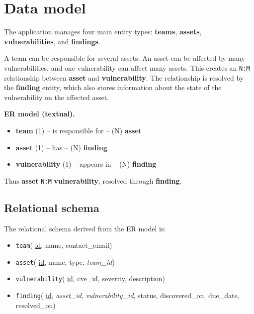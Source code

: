 \documentclass[11pt,a4paper]{article}
\begin{document}
\section{Data model}

The application manages four main entity types:
\textbf{teams}, \textbf{assets}, \textbf{vulnerabilities}, and
\textbf{findings}.

A team can be responsible for several assets. An asset can be affected by many
vulnerabilities, and one vulnerability can affect many assets. This creates an
\texttt{N:M} relationship between \textbf{asset} and
\textbf{vulnerability}. The relationship is resolved by the
\textbf{finding} entity, which also stores information about the state of the
vulnerability on the affected asset.

\begin{beispielbox}
\textbf{ER model (textual).}
\begin{itemize}[leftmargin=1.4em, topsep=2pt]
  \item \textbf{team} (1) \;--\; is responsible for \;--\; (N) \textbf{asset}
  \item \textbf{asset} (1) \;--\; has \;--\; (N) \textbf{finding}
  \item \textbf{vulnerability} (1) \;--\; appears in \;--\; (N) \textbf{finding}
\end{itemize}

Thus \textbf{asset} \texttt{N:M} \textbf{vulnerability}, resolved through
\textbf{finding}.
\end{beispielbox}

\subsection{Relational schema}

The relational schema derived from the ER model is:

\begin{itemize}[leftmargin=1.4em]
  \item \texttt{team}(
        \underline{id},
        name,
        contact\_email)

  \item \texttt{asset}(
        \underline{id},
        name,
        type,
        \emph{team\_id})

  \item \texttt{vulnerability}(
        \underline{id},
        cve\_id,
        severity,
        description)

  \item \texttt{finding}(
        \underline{id},
        \emph{asset\_id},
        \emph{vulnerability\_id},
        status,
        discovered\_on,
        due\_date,
        resolved\_on)
\end{itemize}
\end{document}

